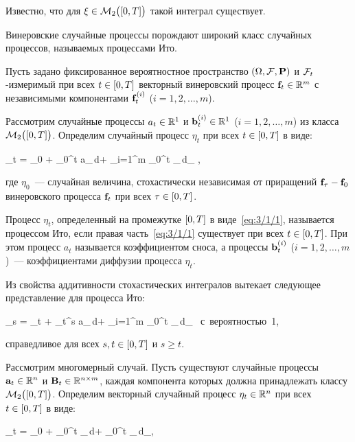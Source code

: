 Известно, что для $\xi \in \mathcal{M}_2\bigl( [0, T] \bigr)$ такой интеграл существует\cite{KLOEDEN}.

\br

Винеровские случайные процессы порождают широкий класс случайных процессов, называемых процессами Ито.

Пусть задано фиксированное вероятностное пространство $(\Omega, \mathcal{F}, \mathbf{P})$ и $\mathcal{F}_t$-измеримый при всех $t \in [0, T]$ векторный винеровский процесс $\mathbf{f}_t \in \mathbb{R}^{m}$ с независимыми компонентами $\mathbf{f}_t^{(i)}$ ($i = 1, 2, \ldots, m$).

Рассмотрим случайные процессы $a_t \in \mathbb{R}^{1}$ и $\mathbf{b}_t^{(i)} \in \mathbb{R}^{1}$ ($i = 1, 2, \ldots, m$) из класса $\mathcal{M}_2\bigl( [0, T] \bigr)$. Определим случайный процесс $\eta_t$ при всех $t \in [0, T]$ в виде:

	\eta_t = \eta_0 + \int\limits_0^t a_\tau\,d\tau + \sum\limits_{i=1}^m \int\limits_0^t _\tau{}\,d_\tau{} \mbox{,}
\eeq

где $\eta_0$~--- случайная величина, стохастически независимая от приращений $\mathbf{f}_\tau-\mathbf{f}_0$ винеровского процесса $\mathbf{f}_t$ при всех $\tau \in [0, T]$.

\begin{df}
	Процесс $\eta_t$, определенный на промежутке $[0, T]$ в виде~\ref{eq:3/1/1}, называется процессом Ито, если правая часть~\ref{eq:3/1/1} существует при всех $t \in [0, T]$. При этом процесс $a_t$ называется коэффициентом сноса, а процессы $\mathbf{b}_t^{(i)}$ ($i = 1, 2, \ldots, m$)~--- коэффициентами диффузии процесса $\eta_t$.
\end{df}

Из свойства аддитивности стохастических интегралов вытекает следующее представление для процесса Ито:

	\eta_s = \eta_t + \int\limits_t^s a_\tau\,d\tau + \sum\limits_{i=1}^m \int\limits_0^t _\tau{}\,d_\tau{} \mbox{ с вероятностью 1,}
\eeq

справедливое для всех $s, t \in [0, T]$ и $s \geqslant t$.

Рассмотрим многомерный случай. Пусть существуют случайные процессы $\mathbf{a}_t \in \mathbb{R}^{n}$ и $\mathbf{B}_t \in \mathbb{R}^{{n} \times {m}}$, каждая компонента которых должна принадлежать классу $\mathcal{M}_2\bigl( [0, T] \bigr)$. Определим векторный случайный процесс $\mathbf{\eta}_t \in \mathbb{R}^{n}$ при всех $t \in [0, T]$ в виде:

	\m{\eta}_t = \m{\eta}_0 + \int\limits_0^t _\tau\,d\tau + \int\limits_0^t _\tau\,d_\tau \mbox{,}
\eeq

